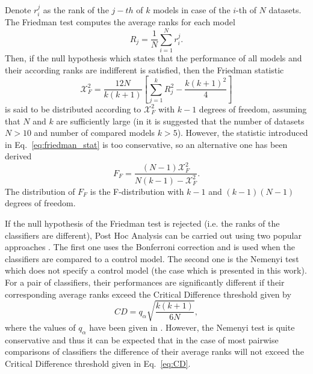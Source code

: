 \documentclass[magisterska, english]{pwr_wmat_praca_dyplomowa}
\theoremstyle{plain}
\numberwithin{theorem}{chapter}
\theoremstyle{definition}
\numberwithin{theorem}{chapter}
\begin{document}
Denote $r_i^j$ as the rank of the $j-th$ of $k$ models in case of the $i$-th of $N$ datasets. The Friedman test computes the average ranks for each model
\begin{equation}
    R_j = \frac 1N \sum_{i=1}^N r_i^j.
\end{equation}
Then, if the null hypothesis which states that the performance of all models and their according ranks are indifferent is satisfied, then the Friedman statistic \cite{demsar}
\begin{equation}\label{eq:friedman_stat}
    \mathcal{X}_F^2 = \frac{12N}{k(k+1)} \left[\sum_{j=1}^k R_j^2 - \frac{k(k+1)^2}{4}\right]
\end{equation}
is said to be distributed according to $\mathcal{X}_F^2$ with $k-1$ degrees of freedom, assuming that $N$ and $k$ are sufficiently large (in \cite{demsar} it is suggested that the number of datasets $N>10$ and number of compared models $k>5$). However, the statistic introduced in Eq.~\eqref{eq:friedman_stat} is too conservative, so an alternative one has been derived
\begin{equation}\label{eq:iman_dav}
    F_F = \frac{(N-1)\mathcal{X}_F^2}{N(k-1)-\mathcal{X}_F^2}.
\end{equation}
The distribution of $F_F$ is the F-distribution with $k-1$ and $(k-1)(N-1)$ degrees of freedom.

If the null hypothesis of the Friedman test is rejected (i.e. the ranks of the classifiers are different), Post Hoc Analysis can be carried out using two popular approaches \cite{demsar}. The first one uses the Bonferroni correction and is used when the classifiers are compared to a control model. The second one is the Nemenyi test which does not specify a control model (the case which is presented in this work). For a pair of classifiers, their performances are significantly different if their corresponding average ranks exceed the Critical Difference threshold given by
\begin{equation}\label{eq:CD}
    CD = q_{\alpha}\sqrt{\frac{k(k+1)}{6N}},
\end{equation}
where the values of $q_{\alpha}$ have been given in \cite{demsar}. However, the Nemenyi test is quite conservative and thus it can be expected that in the case of most pairwise comparisons of classifiers the difference of their average ranks will not exceed the Critical Difference threshold given in Eq.~\eqref{eq:CD}.
\end{document}
